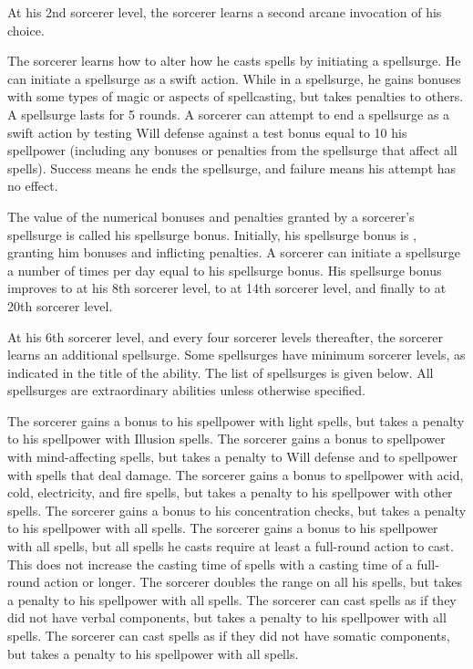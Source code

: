 At his 2nd sorcerer level, the sorcerer learns a second arcane invocation of his choice.

The sorcerer learns how to alter how he casts spells by initiating a spellsurge.
He can initiate a spellsurge as a swift action.
While in a spellsurge, he gains bonuses with some types of magic or aspects of spellcasting, but takes penalties to others.
A spellsurge lasts for 5 rounds.
A sorcerer can attempt to end a spellsurge as a swift action by testing Will defense against a test bonus equal to 10 \add his spellpower (including any bonuses or penalties from the spellsurge that affect all spells).
Success means he ends the spellsurge, and failure means his attempt has no effect.

The value of the numerical bonuses and penalties granted by a sorcerer's spellsurge is called his spellsurge bonus.
Initially, his spellsurge bonus is , granting him  bonuses and inflicting  penalties.
A sorcerer can initiate a spellsurge a number of times per day equal to his spellsurge bonus.
His spellsurge bonus improves to  at his 8th sorcerer level, to  at 14th sorcerer level, and finally to  at 20th sorcerer level.

At his 6th sorcerer level, and every four sorcerer levels thereafter, the sorcerer learns an additional spellsurge.
Some spellsurges have minimum sorcerer levels, as indicated in the title of the ability.
The list of spellsurges is given below.
All spellsurges are extraordinary abilities unless otherwise specified.

The sorcerer gains a bonus to his spellpower with light spells, but takes a penalty to his spellpower with Illusion spells.
The sorcerer gains a bonus to spellpower with mind-affecting spells, but takes a penalty to Will defense and to spellpower with spells that deal damage.
The sorcerer gains a bonus to spellpower with acid, cold, electricity, and fire spells, but takes a penalty to his spellpower with other spells.
The sorcerer gains a bonus to his concentration checks, but takes a penalty to his spellpower with all spells.
The sorcerer gains a bonus to his spellpower with all spells, but all spells he casts require at least a full-round action to cast.
This does not increase the casting time of spells with a casting time of a full-round action or longer.
The sorcerer doubles the range on all his spells, but takes a penalty to his spellpower with all spells.
The sorcerer can cast spells as if they did not have verbal components, but takes a penalty to his spellpower with all spells.
The sorcerer can cast spells as if they did not have somatic components, but takes a penalty to his spellpower with all spells.

